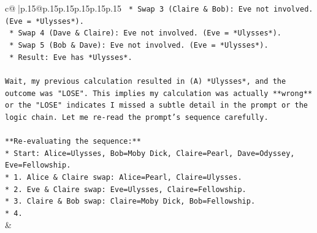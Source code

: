 \documentclass{article}
\begin{document}
{\begin{supertabular}{c@{$\;$}|p{.15\linewidth}@{}p{.15\linewidth}p{.15\linewidth}p{.15\linewidth}p{.15\linewidth}p{.15\linewidth}}
{{{\texttt{        *   Swap 3 (Claire \& Bob): Eve not involved. (Eve = *Ulysses*).} \\
\texttt{        *   Swap 4 (Dave \& Claire): Eve not involved. (Eve = *Ulysses*).} \\
\texttt{        *   Swap 5 (Bob \& Dave): Eve not involved. (Eve = *Ulysses*).} \\
\texttt{    *   Result: Eve has *Ulysses*.} \\
\\ 
\texttt{Wait, my previous calculation resulted in (A) *Ulysses*, and the outcome was "LOSE". This implies my calculation was actually **wrong** or the "LOSE" indicates I missed a subtle detail in the prompt or the logic chain. Let me re{-}read the prompt's sequence carefully.} \\
\\ 
\texttt{**Re{-}evaluating the sequence:**} \\
\texttt{*   Start: Alice=Ulysses, Bob=Moby Dick, Claire=Pearl, Dave=Odyssey, Eve=Fellowship.} \\
\texttt{*   1. Alice \& Claire swap: Alice=Pearl, Claire=Ulysses.} \\
\texttt{*   2. Eve \& Claire swap: Eve=Ulysses, Claire=Fellowship.} \\
\texttt{*   3. Claire \& Bob swap: Claire=Moby Dick, Bob=Fellowship.} \\
\texttt{*   4.} \\
            }
        }
    }
    & \\ \\

\end{supertabular}
}
\end{document}
